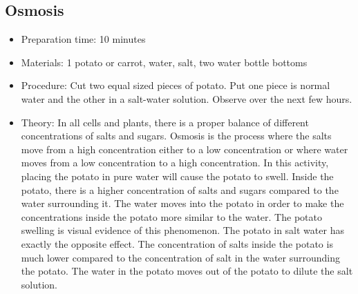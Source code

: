 \subsection{Osmosis}
\begin{itemize}
\item{Preparation time: 10 minutes}
\item{Materials: 1 potato or carrot, water, salt, two water bottle bottoms}
\item{Procedure: Cut two equal sized pieces of potato. Put one piece is normal water and the other in a salt-water solution. Observe over the next few hours.}
\item{Theory: In all cells and plants, there is a proper balance of different concentrations of salts and sugars. Osmosis is the process where the salts move from a high concentration either to a low concentration or where water moves from a low concentration to a high concentration. In this activity, placing the potato in pure water will cause the potato to swell. Inside the potato, there is a higher concentration of salts and sugars compared to the water surrounding it. The water moves into the potato in order to make the concentrations inside the potato more similar to the water. The potato swelling is visual evidence of this phenomenon. The potato in salt water has exactly the opposite effect. The concentration of salts inside the potato is much lower compared to the concentration of salt in the water surrounding the potato. The water in the potato moves out of the potato to dilute the salt solution.}
\end{itemize}